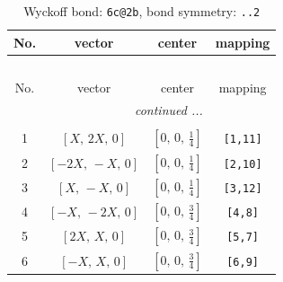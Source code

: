 \documentclass[fleqn,8pt]{jsarticle}
\begin{document}
\renewcommand{\arraystretch}{1.2}
\begin{longtable}{cccc}
\caption{Wyckoff bond: {\tt 6c@2b}, bond symmetry: {\tt ..2}}
 \\
 \hline \hline
No. & vector & center & mapping \\ \hline \endfirsthead

\multicolumn{3}{l}{\tablename\ \thetable{}} \\
 \hline \hline
No. & vector & center & mapping \\ \hline \endhead

 \hline \hline
\multicolumn{3}{r}{\footnotesize\it continued ...} \\ \endfoot

 \hline \hline
\multicolumn{3}{r}{} \\ \endlastfoot

1 & $\left[ X,\, 2 X,\, 0 \right]$ & $\left[ 0,\, 0,\, \frac{1}{4} \right]$ & {\tt [1,11]} \\ \hline
2 & $\left[ - 2 X,\, - X,\, 0 \right]$ & $\left[ 0,\, 0,\, \frac{1}{4} \right]$ & {\tt [2,10]} \\ \hline
3 & $\left[ X,\, - X,\, 0 \right]$ & $\left[ 0,\, 0,\, \frac{1}{4} \right]$ & {\tt [3,12]} \\ \hline
4 & $\left[ - X,\, - 2 X,\, 0 \right]$ & $\left[ 0,\, 0,\, \frac{3}{4} \right]$ & {\tt [4,8]} \\ \hline
5 & $\left[ 2 X,\, X,\, 0 \right]$ & $\left[ 0,\, 0,\, \frac{3}{4} \right]$ & {\tt [5,7]} \\ \hline
6 & $\left[ - X,\, X,\, 0 \right]$ & $\left[ 0,\, 0,\, \frac{3}{4} \right]$ & {\tt [6,9]} \\
\end{longtable}
\renewcommand{\arraystretch}{1.2}
\end{document}
